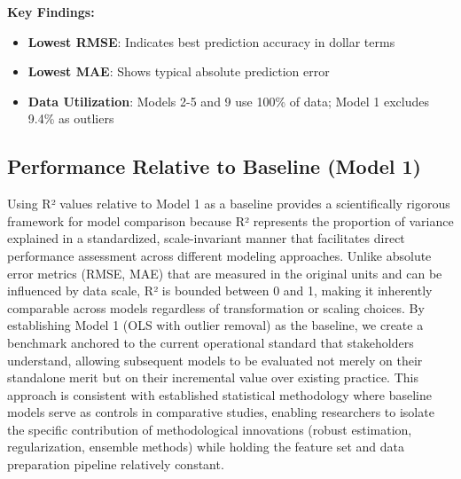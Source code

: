 \textbf{Key Findings:}
\begin{itemize}
    \item \textbf{Lowest RMSE}: Indicates best prediction accuracy in dollar terms
    \item \textbf{Lowest MAE}: Shows typical absolute prediction error
    \item \textbf{Data Utilization}: Models 2-5 and 9 use 100\% of data; Model 1 excludes 9.4\% as outliers
\end{itemize}


\subsection{Performance Relative to Baseline (Model 1)}Using R² values relative to Model 1 as a baseline provides a scientifically rigorous framework for model comparison because R² represents the proportion of variance explained in a standardized, scale-invariant manner that facilitates direct performance assessment across different modeling approaches. Unlike absolute error metrics (RMSE, MAE) that are measured in the original units and can be influenced by data scale, R² is bounded between 0 and 1, making it inherently comparable across models regardless of transformation or scaling choices. By establishing Model 1 (OLS with outlier removal) as the baseline, we create a benchmark anchored to the current operational standard that stakeholders understand, allowing subsequent models to be evaluated not merely on their standalone merit but on their incremental value over existing practice. This approach is consistent with established statistical methodology where baseline models serve as controls in comparative studies, enabling researchers to isolate the specific contribution of methodological innovations (robust estimation, regularization, ensemble methods) while holding the feature set and data preparation pipeline relatively constant.


